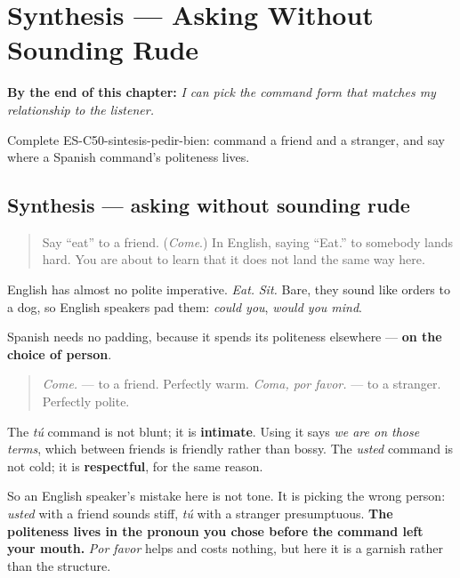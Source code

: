 
\chapter{Synthesis --- Asking Without Sounding Rude}
\label{ch:synthesis-commands}

\begin{chapteropening}
\textbf{By the end of this chapter:} \emph{I can pick the command form that matches my relationship to the listener.}

Complete ES-C50-sintesis-pedir-bien: command a friend and a stranger, and say where a Spanish command's politeness lives.
\end{chapteropening}

\section[Practice]{Synthesis — asking without sounding rude}

\label{lesson:ES-C50-sintesis-pedir-bien}



\begin{quote}
Say \textquotedblleft{}eat\textquotedblright{} to a friend. (\emph{Come}.) In English, saying \textquotedblleft{}Eat.\textquotedblright{} to somebody lands hard. You are about to learn that it does not land the same way here.
\end{quote}

\begin{culture}
English has almost no polite imperative. \emph{Eat.} \emph{Sit.} Bare, they sound like orders to a dog, so English speakers pad them: \emph{could you}, \emph{would you mind}.

Spanish needs no padding, because it spends its politeness elsewhere — \textbf{on the choice of person}.

\begin{quote}
\emph{Come.} — to a friend. Perfectly warm. \emph{Coma, por favor.} — to a stranger. Perfectly polite.
\end{quote}

The \emph{tú} command is not blunt; it is \textbf{intimate}. Using it says \emph{we are on those terms}, which between friends is friendly rather than bossy. The \emph{usted} command is not cold; it is \textbf{respectful}, for the same reason.

So an English speaker's mistake here is not tone. It is picking the wrong person: \emph{usted} with a friend sounds stiff, \emph{tú} with a stranger presumptuous. \textbf{The politeness lives in the pronoun you chose before the command left your mouth.} \emph{Por favor} helps and costs nothing, but here it is a garnish rather than the structure.
\end{culture}

